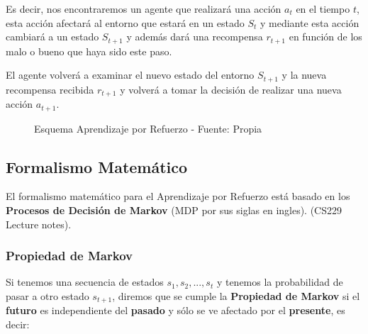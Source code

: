 \documentclass[
  a4paper,
  DIV=11,
  numbers=noendperiod]{scrreprt}
\begin{document}
Es decir, nos encontraremos un agente que realizará una acción \(a_t\)
en el tiempo \(t\), esta acción afectará al entorno que estará en un
estado \(S_t\) y mediante esta acción cambiará a un estado \(S_{t+1}\) y
además dará una recompensa \(r_{t+1}\) en función de los malo o bueno
que haya sido este paso.

El agente volverá a examinar el nuevo estado del entorno \(S_{t+1}\) y
la nueva recompensa recibida \(r_{t+1}\) y volverá a tomar la decisión
de realizar una nueva acción \(a_{t+1}\).

\begin{figure}


\caption{\label{fig-rl_diagrama}Esquema Aprendizaje por Refuerzo -
Fuente: Propia}

\end{figure}%

\subsection{Formalismo Matemático}\label{formalismo-matemuxe1tico}

El formalismo matemático para el Aprendizaje por Refuerzo está basado en
los \textbf{Procesos de Decisión de Markov} (MDP por sus siglas en
ingles). (CS229 Lecture notes).

\subsubsection{Propiedad de Markov}\label{propiedad-de-markov}

Si tenemos una secuencia de estados \(s_1, s_2, ..., s_t\) y tenemos la
probabilidad de pasar a otro estado \(s_{t+1}\), diremos que se cumple
la \textbf{Propiedad de Markov} si el \textbf{futuro} es independiente
del \textbf{pasado} y sólo se ve afectado por el \textbf{presente}, es
decir:
\end{document}
